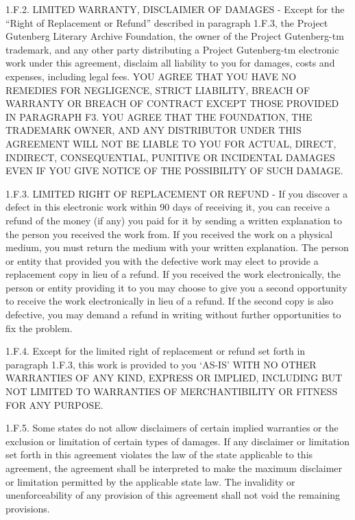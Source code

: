 \documentclass[12pt,oneside]{scrbook}
\begin{document}
  1.F.2. LIMITED WARRANTY, DISCLAIMER OF DAMAGES - Except for the ``Right
  of Replacement or Refund'' described in paragraph 1.F.3, the Project
  Gutenberg Literary Archive Foundation, the owner of the Project
  Gutenberg-tm trademark, and any other party distributing a Project
  Gutenberg-tm electronic work under this agreement, disclaim all
  liability to you for damages, costs and expenses, including legal fees.
  YOU AGREE THAT YOU HAVE NO REMEDIES FOR NEGLIGENCE, STRICT LIABILITY,
  BREACH OF WARRANTY OR BREACH OF CONTRACT EXCEPT THOSE PROVIDED IN
  PARAGRAPH F3. YOU AGREE THAT THE FOUNDATION, THE TRADEMARK OWNER, AND
  ANY DISTRIBUTOR UNDER THIS AGREEMENT WILL NOT BE LIABLE TO YOU FOR
  ACTUAL, DIRECT, INDIRECT, CONSEQUENTIAL, PUNITIVE OR INCIDENTAL DAMAGES
  EVEN IF YOU GIVE NOTICE OF THE POSSIBILITY OF SUCH DAMAGE.
  
  1.F.3. LIMITED RIGHT OF REPLACEMENT OR REFUND - If you discover a defect
  in this electronic work within 90 days of receiving it, you can receive
  a refund of the money (if any) you paid for it by sending a written
  explanation to the person you received the work from. If you received
  the work on a physical medium, you must return the medium with your
  written explanation. The person or entity that provided you with the
  defective work may elect to provide a replacement copy in lieu of a
  refund. If you received the work electronically, the person or entity
  providing it to you may choose to give you a second opportunity to
  receive the work electronically in lieu of a refund. If the second copy
  is also defective, you may demand a refund in writing without further
  opportunities to fix the problem.
  
  1.F.4. Except for the limited right of replacement or refund set forth
  in paragraph 1.F.3, this work is provided to you `AS-IS' WITH NO OTHER
  WARRANTIES OF ANY KIND, EXPRESS OR IMPLIED, INCLUDING BUT NOT LIMITED TO
  WARRANTIES OF MERCHANTIBILITY OR FITNESS FOR ANY PURPOSE.
  
  1.F.5. Some states do not allow disclaimers of certain implied
  warranties or the exclusion or limitation of certain types of damages.
  If any disclaimer or limitation set forth in this agreement violates the
  law of the state applicable to this agreement, the agreement shall be
  interpreted to make the maximum disclaimer or limitation permitted by
  the applicable state law. The invalidity or unenforceability of any
  provision of this agreement shall not void the remaining provisions.
  
\end{document}
